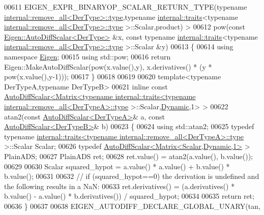 \begin{DoxyCode}
00611 EIGEN\_EXPR\_BINARYOP\_SCALAR\_RETURN\_TYPE(\textcolor{keyword}{typename} 
      \hyperlink{group___sparse_core___module}{internal::remove\_all<DerType>::type},\textcolor{keyword}{typename} 
      \hyperlink{struct_eigen_1_1internal_1_1traits}{internal::traits}<\textcolor{keyword}{typename} \hyperlink{group___sparse_core___module}{internal::remove\_all<DerType>::type}
      >::Scalar,product) >
00612 pow(\textcolor{keyword}{const} \hyperlink{class_eigen_1_1_auto_diff_scalar}{Eigen::AutoDiffScalar<DerType>} &x, \textcolor{keyword}{const} \textcolor{keyword}{typename} 
      \hyperlink{struct_eigen_1_1internal_1_1traits}{internal::traits}<\textcolor{keyword}{typename} \hyperlink{group___sparse_core___module}{internal::remove\_all<DerType>::type}
      >::Scalar &y)
00613 \{
00614   \textcolor{keyword}{using namespace }\hyperlink{namespace_eigen}{Eigen};
00615   \textcolor{keyword}{using} std::pow;
00616   \textcolor{keywordflow}{return} Eigen::MakeAutoDiffScalar(pow(x.value(),y), x.derivatives() * (y * pow(x.value(),y-1)));
00617 \}
00618 
00619 
00620 \textcolor{keyword}{template}<\textcolor{keyword}{typename} DerTypeA,\textcolor{keyword}{typename} DerTypeB>
00621 \textcolor{keyword}{inline} \textcolor{keyword}{const} 
      \hyperlink{class_eigen_1_1_auto_diff_scalar}{AutoDiffScalar<Matrix<typename internal::traits<typename internal::remove\_all<DerTypeA>::type}
      >::Scalar,\hyperlink{namespace_eigen_ad81fa7195215a0ce30017dfac309f0b2}{Dynamic},1> >
00622 atan2(\textcolor{keyword}{const} \hyperlink{class_eigen_1_1_auto_diff_scalar}{AutoDiffScalar<DerTypeA>}& a, \textcolor{keyword}{const} 
      \hyperlink{class_eigen_1_1_auto_diff_scalar}{AutoDiffScalar<DerTypeB>}& b)
00623 \{
00624   \textcolor{keyword}{using} std::atan2;
00625   \textcolor{keyword}{typedef} \textcolor{keyword}{typename} 
      \hyperlink{struct_eigen_1_1internal_1_1traits}{internal::traits<typename internal::remove\_all<DerTypeA>::type}
      >::Scalar Scalar;
00626   \textcolor{keyword}{typedef} \hyperlink{class_eigen_1_1_auto_diff_scalar}{AutoDiffScalar<Matrix<Scalar,Dynamic,1>} > PlainADS;
00627   PlainADS ret;
00628   ret.value() = atan2(a.value(), b.value());
00629   
00630   Scalar squared\_hypot = a.value() * a.value() + b.value() * b.value();
00631   
00632   \textcolor{comment}{// if (squared\_hypot==0) the derivation is undefined and the following results in a NaN:}
00633   ret.derivatives() = (a.derivatives() * b.value() - a.value() * b.derivatives()) / squared\_hypot;
00634 
00635   \textcolor{keywordflow}{return} ret;
00636 \}
00637 
00638 EIGEN\_AUTODIFF\_DECLARE\_GLOBAL\_UNARY(tan,

\end{DoxyCode}
